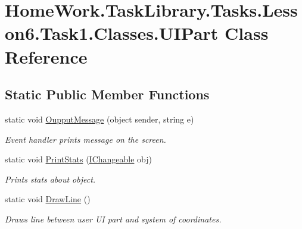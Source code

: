 \hypertarget{class_home_work_1_1_task_library_1_1_tasks_1_1_lesson6_1_1_task1_1_1_classes_1_1_u_i_part}{}\section{Home\+Work.\+Task\+Library.\+Tasks.\+Lesson6.\+Task1.\+Classes.\+U\+I\+Part Class Reference}
\label{class_home_work_1_1_task_library_1_1_tasks_1_1_lesson6_1_1_task1_1_1_classes_1_1_u_i_part}
\subsection*{Static Public Member Functions}
\begin{DoxyCompactItemize}
\item 
static void \mbox{\hyperlink{class_home_work_1_1_task_library_1_1_tasks_1_1_lesson6_1_1_task1_1_1_classes_1_1_u_i_part_a896ebd9d624b0c5b1d842b796cd3bf51}{Oupput\+Message}} (object sender, string e)
\begin{DoxyCompactList}\small\item\em Event handler prints message on the screen. \end{DoxyCompactList}\item 
static void \mbox{\hyperlink{class_home_work_1_1_task_library_1_1_tasks_1_1_lesson6_1_1_task1_1_1_classes_1_1_u_i_part_a998e734d497e128c9168c53ac2b7933b}{Print\+Stats}} (\mbox{\hyperlink{interface_home_work_1_1_task_library_1_1_tasks_1_1_lesson6_1_1_task1_1_1_interfaces_1_1_i_changeable}{I\+Changeable}} obj)
\begin{DoxyCompactList}\small\item\em Prints stats about object. \end{DoxyCompactList}\item 
static void \mbox{\hyperlink{class_home_work_1_1_task_library_1_1_tasks_1_1_lesson6_1_1_task1_1_1_classes_1_1_u_i_part_a3cb4ce1df6731cc8f25445572f237357}{Draw\+Line}} ()
\begin{DoxyCompactList}\small\item\em Draws line between user UI part and system of coordinates. \end{DoxyCompactList}\end{DoxyCompactItemize}

